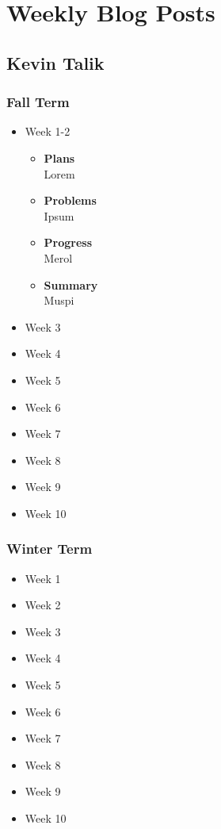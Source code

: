 
\section{Weekly Blog Posts}
	\subsection{Kevin Talik}
	\subsubsection{Fall Term}
	\begin{itemize}
		\item{Week 1-2}
			\begin{itemize}
				\item \textbf{Plans} \\
				Lorem
				\item \textbf{Problems} \\
				Ipsum
				\item \textbf{Progress} \\
				Merol
				\item \textbf{Summary} \\
				Muspi
			\end{itemize}
		\item{Week 3}
		\item{Week 4}
		\item{Week 5}
		\item{Week 6}
		\item{Week 7}
		\item{Week 8}
		\item{Week 9}
		\item{Week 10}
	\end{itemize}
	\subsubsection{Winter Term}
	\begin{itemize}
		\item{Week 1}
		\item{Week 2}
		\item{Week 3}
		\item{Week 4}
		\item{Week 5}
		\item{Week 6}
		\item{Week 7}
		\item{Week 8}
		\item{Week 9}
		\item{Week 10}
	\end{itemize}

